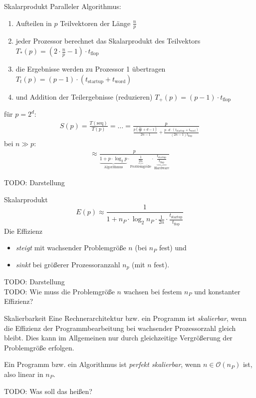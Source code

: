 \begin{example}[Speedup]{Skalarprodukt}
    Paralleler Algorithmus:
    \begin{enumerate}
        \item Aufteilen in $p$ Teilvektoren der Länge $\frac{n}{p}$
        \item jeder Prozessor berechnet das Skalarprodukt des Teilvektors $T_* (p) = \left(2 \cdot \frac{n}{p} - 1\right) \cdot t_\text{flop}$
        \item die Ergebnisse werden zu Prozessor 1 übertragen $T_t (p) = (p - 1) \cdot (t_\text{startup} + t_\text{word})$
        \item und Addition der Teilergebnisse (reduzieren) $T_+ (p) = (p - 1) \cdot t_\text{flop}$
    \end{enumerate}
    für $p=2^d$:
    \begin{align*}
        S(p) = \frac{T(\text{seq})}{T(p)} = \ldots =
        \frac{p}{\frac{p(\frac{2n}{p} + d-1)}{2n-1} + \frac{p\cdot d\cdot (t_\text{startup} + t_\text{word})}{(2n - 1)t_\text{flop}}}
    \end{align*}
    bei $n\gg p$:
    \begin{align*}
        \approx\frac{p}{
        \underbrace{1 + p\cdot \log_2 p}_{\text{Algorithmus}} \cdot
        \underbrace{\frac{1}{2n}}_{\text{Problemgröße}} \cdot
        \underbrace{\frac{t_\text{startup}}{t_\text{flop}}}_{\text{Hardware}}}
    \end{align*}
    
    TODO: Darstellung
\end{example}

\begin{example}[Effizienz]{Skalarprodukt}
    \[
        E(p) \approx \frac{1}{1 + n_P \cdot \log_2 n_P \cdot \frac{1}{2n} \cdot \frac{t_\text{startup}}{t_\text{flop}}}
    \]
    Die Effizienz
    \begin{itemize}
        \item \emph{steigt} mit wachsender Problemgröße $n$ (bei $n_P$ fest) und
        \item \emph{sinkt} bei größerer Prozessoranzahl $n_p$ (mit $n$ fest).
    \end{itemize}
    
    TODO: Darstellung\\
    TODO: Wie muss die Problemgröße $n$ wachsen bei festem $n_P$ und konstanter Effizienz?
\end{example}

\begin{defi}{Skalierbarkeit}
    Eine Rechnerarchitektur bzw. ein Programm ist \emph{skalierbar}, wenn die Effizienz der Programmbearbeitung bei wachsender Prozessorzahl gleich bleibt.
    Dies kann im Allgemeinen nur durch gleichzeitige Vergrößerung der Problemgröße erfolgen.
    
    Ein Programm bzw. ein Algorithmus ist \emph{perfekt skalierbar}, wenn $n \in \mathcal{O}(n_P)$ ist, also linear in $n_P$.
    
    TODO: Was soll das heißen?
\end{defi}

